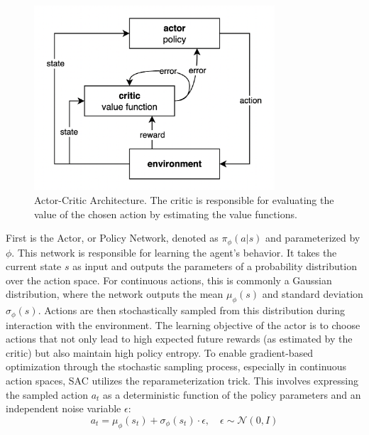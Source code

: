 \begin{figure}
  \centering
    \includegraphics[width=0.8\textwidth]{images/AC_architecture.png}
    \caption{Actor-Critic Architecture. The critic is responsible for evaluating the value of the chosen action by estimating the value functions.}
    \label{fig:AC}
\end{figure}

First is the Actor, or Policy Network, denoted as \(\pi_\phi(a|s)\) and parameterized by \(\phi\). This network is responsible for learning the agent's behavior. It takes the current state \(s\) as input and outputs the parameters of a probability distribution over the action space. For continuous actions, this is commonly a Gaussian distribution, where the network outputs the mean \(\mu_\phi(s)\) and standard deviation \(\sigma_\phi(s)\). Actions are then stochastically sampled from this distribution during interaction with the environment. The  learning objective of the actor is to choose actions that not only lead to high expected future rewards (as estimated by the critic) but also maintain high policy entropy. To enable gradient-based optimization through the stochastic sampling process, especially in continuous action spaces, \gls{SAC} utilizes the reparameterization trick. This involves expressing the sampled action \(a_t\) as a deterministic function of the policy parameters and an independent noise variable \(\epsilon\): 
\[a_t = \mu_\phi(s_t) + \sigma_\phi(s_t) \cdot \epsilon, \quad \epsilon \sim \mathcal{N}(0,I)\]

